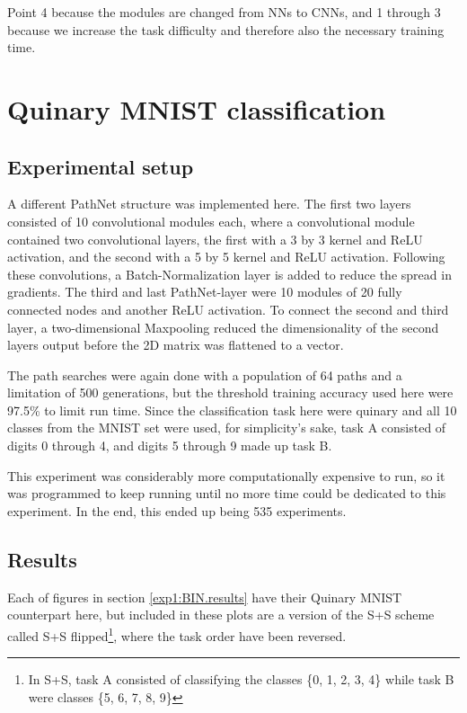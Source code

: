 Point 4 because the modules are changed from NNs to CNNs, and 1 through 3 because we increase the task difficulty and therefore also the necessary training time. 

\section{Quinary MNIST classification}
\subsection{Experimental setup}
A different PathNet structure was implemented here. The first two layers consisted of 10 convolutional modules each, where a convolutional module contained two convolutional layers, the first with a 3 by 3 kernel and ReLU activation, and the second with a 5 by 5 kernel and ReLU activation. Following these convolutions, a Batch-Normalization layer is added to reduce the spread in gradients. The third and last PathNet-layer were 10 modules of 20 fully connected nodes and another ReLU activation. To connect the second and third layer, a two-dimensional Maxpooling reduced the dimensionality of the second layers output before the 2D matrix was flattened to a vector.   

The path searches were again done with a population of 64 paths and a limitation of 500 generations, but the threshold training accuracy used here were 97.5\% to limit run time. 
Since the classification task here were quinary and all 10 classes from the MNIST set were used, for simplicity's sake, task A consisted of digits 0 through 4, and digits 5 through 9 made up task B. 

This experiment was considerably more computationally expensive to run, so it was programmed to keep running until no more time could be dedicated to this experiment. In the end, this ended up being 535 experiments. 

\subsection{Results}
\label{exp1:results.quinary}
Each of figures in section \ref{exp1:BIN.results} have their Quinary MNIST counterpart here, but included in these plots are a version of the S+S scheme called S+S flipped\footnote{In S+S, task A consisted of classifying the classes \{0, 1, 2, 3, 4\} while task B were classes \{5, 6, 7, 8, 9\}}, where the task order have been reversed.

